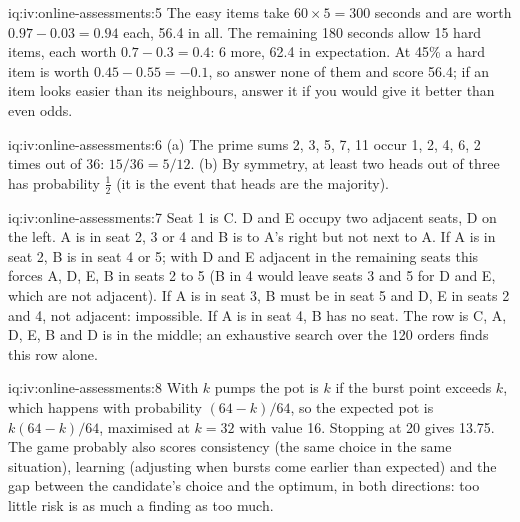 \begin{solution}{iq:iv:online-assessments:5}
The easy items take $60 \times 5 = 300$ seconds and are worth $0.97 - 0.03 = 0.94$ each, 56.4 in all. The
remaining 180 seconds allow 15 hard items, each worth $0.7 - 0.3 = 0.4$: 6 more, 62.4 in expectation. At 45\%
a hard item is worth $0.45 - 0.55 = -0.1$, so answer none of them and score 56.4; if an item looks easier than
its neighbours, answer it if you would give it better than even odds.
\end{solution}

\begin{solution}{iq:iv:online-assessments:6}
(a) The prime sums 2, 3, 5, 7, 11 occur 1, 2, 4, 6, 2 times out of 36: $15/36 = 5/12$. (b) By symmetry, at
least two heads out of three has probability $\tfrac12$ (it is the event that heads are the majority).
\end{solution}

\begin{solution}{iq:iv:online-assessments:7}
Seat 1 is C. D and E occupy two adjacent seats, D on the left. A is in seat 2, 3 or 4 and B is to A's right but
not next to A. If A is in seat 2, B is in seat 4 or 5; with D and E adjacent in the remaining seats this
forces A, D, E, B in seats 2 to 5 (B in 4 would leave seats 3 and 5 for D and E, which are not adjacent). If A
is in seat 3, B must be in seat 5 and D, E in seats 2 and 4, not adjacent: impossible. If A is in seat 4, B
has no seat. The row is C, A, D, E, B and D is in the middle; an exhaustive search over the 120 orders finds
this row alone.
\end{solution}

\begin{solution}{iq:iv:online-assessments:8}
With $k$ pumps the pot is $k$ if the burst point exceeds $k$, which happens with probability $(64 - k)/64$,
so the expected pot is $k(64 - k)/64$, maximised at $k = 32$ with value 16. Stopping at 20 gives 13.75. The
game probably also scores consistency (the same choice in the same situation), learning (adjusting when
bursts come earlier than expected) and the gap between the candidate's choice and the optimum, in both
directions: too little risk is as much a finding as too much.
\end{solution}

